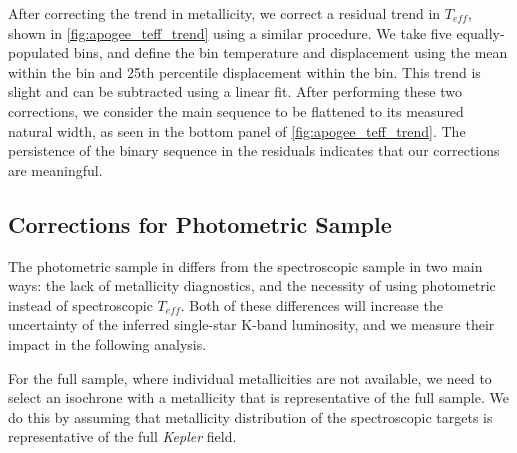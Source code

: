 \documentclass[manuscript]{aastex6}
\newcommand{\Kepler}{\mbox{\textit{Kepler}}}
\newcommand{\Teff}{\ensuremath{T_{eff}}}
\begin{document}
After correcting the trend in metallicity, we correct a residual trend in
\Teff{}, shown in \cref{fig:apogee_teff_trend} using a similar procedure. We
take five equally-populated bins, and define the bin temperature and 
displacement using the mean within the bin  and 25th percentile displacement
within the bin.  This trend is slight and can be subtracted using a linear 
fit. After performing these two corrections, we consider the main sequence to be 
flattened to its measured natural width, as seen in the bottom panel of 
\cref{fig:apogee_teff_trend}. The persistence of the binary sequence in the 
residuals indicates that our corrections are meaningful.  

\subsection{Corrections for Photometric Sample}

The photometric sample in \citet{McQuillan14} differs from the spectroscopic
sample in two main ways: the lack of metallicity diagnostics, and the necessity
of using photometric instead of spectroscopic \Teff{}. Both of these
differences will increase the uncertainty of the inferred single-star K-band
luminosity, and we measure their impact in the following analysis.

For the full \citet{McQuillan14} sample, where individual metallicities are not
available, we need to select an isochrone with a metallicity that is 
representative of the full sample. We do this by assuming that metallicity 
distribution of the spectroscopic targets is representative of the full 
\Kepler{} field. 

\begin{figure*}[htb]
    \centering
    \caption{\emph{Left:} Metallicity distribution of the \Kepler{} cool 
        dwarfs, selected as having \(\Teff < 5250 \textrm{ K }\) and having 
        a luminosity less than 1.3 mag above the single-star sequence. The 
        thick black line denotes the median metallicity while the thin black 
        lines denote the 1-\(\sigma\) confidence intervals. \emph{Right:} The 
        vertical displacement caused by assuming a single metallicity isochrone. 
        The blue line represents the vertical displacement predicted by the
        MIST isochrones imposed by a metallicity mismatch with a [Fe/H] = 0.08 
        dex isochrone for a 5000 K star. The orange line denotes the vertical 
displacement caused by metallicity mismatches after correcting for the 
metallicity-dependent offset of the main sequence relative to the MIST 
isochrones shown in \cref{fig:met_trend}. Because the sample is so sparse
at metallicities below -0.3 dex, the corrections at the metal-poor tail are not 
expected capture the behavior of the K-band at low metallicity.}\label{fig:metallicity}
\end{figure*}
\end{document}
